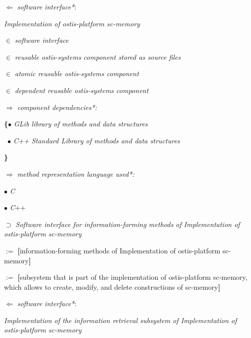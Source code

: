\documentclass[10pt, twocolumn, a4paper]{article}
\begin{document}
\begin{level1}
 \item [ $\Leftarrow$]  \textit{software interface*}:
 \\
 \item[]  \textit{Implementation of ostis-platform sc-memory}
 \item[$\in$] \textit{software interface}
\item[$\in$] \textit{reusable ostis-systems component stored as source files }
\item[$\in$] \textit{atomic reusable ostis-systems component}
\item[$\in$] \textit{dependent reusable ostis-systems component}
\item[$\Rightarrow$] \textit{component dependencies*:}
\item[] \begin{level1}   \item [\textbf{\{}$ \bullet$] \textit{GLib library of methods and data \qquad structures}
\item[\, $ \bullet$] \textit{C++ Standard Library of methods and data structures}
\item[ \textbf{\}}] 

\end{level1}
\item[$\Rightarrow$] \textit{method representation language used*:}

\begin{level1}
\item[ $ \bullet$] \textit{C}
\item[ $ \bullet$] \textit{C}++ 
 \end{level1}

\item[$\supset$] \textit{Software interface for information-forming \qquad methods of Implementation of ostis-platform sc-memory}
\begin{level1}
\item[$:=$] \textbf{[}information-forming methods of Implementation of ostis-platform sc-memory\textbf{]}
\item[$:=$] \textbf{[}subsystem that is part of the implementation of ostis-platform sc-memory, which allows to create, modify, and delete constructions of sc-memory\textbf{]}
\item [ $\Leftarrow$]  \textit{software interface*}:
\item[] \textit{Implementation of the information retrieval subsystem of Implementation of ostis-platform sc-memory}


\end{level1}
\end{level1}
\end{document}
